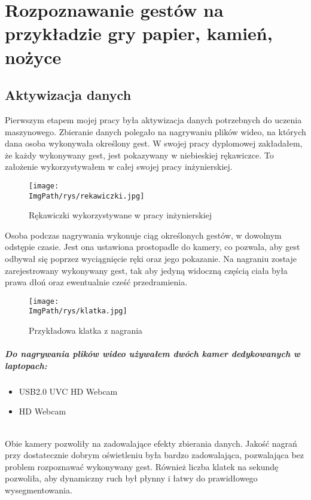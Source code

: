 \documentclass[a4paper,12pt,twoside,openany]{report}
\newcommand{\ImgPath}{.}
\begin{document}
\chapter{Rozpoznawanie gestów na przykładzie gry papier, kamień, nożyce}
\section{Aktywizacja danych}
Pierwszym etapem mojej pracy była aktywizacja danych potrzebnych do uczenia maszynowego. Zbieranie danych polegało na nagrywaniu plików wideo, na których dana osoba wykonywała określony gest. W swojej pracy dyplomowej zakładałem, że każdy wykonywany gest, jest pokazywany w niebieskiej rękawiczce. To założenie wykorzystywałem w całej swojej pracy inżynierskiej.

\begin{figure}[H]	
	\centering
	\texttt{[image: \\ImgPath/rys/rekawiczki.jpg]}
	
	\caption{Rękawiczki wykorzystywane w pracy inżynierskiej}
\end{figure}

Osoba podczas nagrywania wykonuje ciąg określonych gestów, w dowolnym odstępie czasie. Jest ona ustawiona prostopadle do kamery, co pozwala, aby gest odbywał się poprzez wyciągnięcie ręki oraz jego pokazanie. Na nagraniu zostaje zarejestrowany wykonywany gest, tak aby jedyną widoczną częścią ciała była prawa dłoń oraz ewentualnie cześć przedramienia. 

\begin{figure}[H]	
	\centering
	\texttt{[image: \\ImgPath/rys/klatka.jpg]}
	
	\caption{Przykładowa klatka z nagrania}
\end{figure}

\paragraph{Do nagrywania plików wideo używałem dwóch kamer dedykowanych w laptopach:}
\begin{itemize}
	\item USB2.0 UVC HD Webcam
	\item HD Webcam
\end{itemize}
\mbox{} \\

Obie kamery pozwoliły na zadowalające efekty zbierania danych. Jakość nagrań przy dostatecznie dobrym oświetleniu była bardzo zadowalająca, pozwalająca bez problem rozpoznawać wykonywany gest. Również liczba klatek na sekundę pozwoliła, aby dynamiczny ruch był płynny i łatwy do prawidłowego wysegmentowania.
\end{document}
